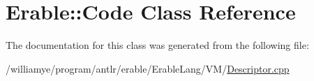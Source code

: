 \hypertarget{class_erable_1_1_code}{}\section{Erable\+::Code Class Reference}
\label{class_erable_1_1_code}


The documentation for this class was generated from the following file\+:\begin{DoxyCompactItemize}
\item 
/williamye/program/antlr/erable/\+Erable\+Lang/\+V\+M/\mbox{\hyperlink{_descriptor_8cpp}{Descriptor.\+cpp}}\end{DoxyCompactItemize}
